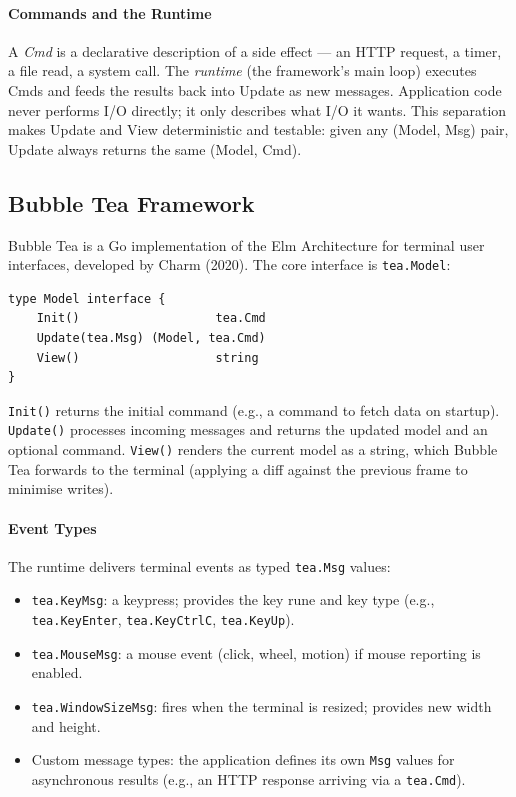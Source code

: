 \paragraph{Commands and the Runtime}

A \emph{Cmd} is a declarative description of a side effect — an HTTP request, a timer, a file read, a system call. The \emph{runtime} (the framework's main loop) executes Cmds and feeds the results back into Update as new messages. Application code never performs I/O directly; it only describes what I/O it wants. This separation makes Update and View deterministic and testable: given any (Model, Msg) pair, Update always returns the same (Model, Cmd).

\subsection{Bubble Tea Framework}

Bubble Tea is a Go implementation of the Elm Architecture for terminal user interfaces, developed by Charm (2020). The core interface is \texttt{tea.Model}:

\begin{verbatim}
type Model interface {
    Init()                   tea.Cmd
    Update(tea.Msg) (Model, tea.Cmd)
    View()                   string
}
\end{verbatim}

\texttt{Init()} returns the initial command (e.g., a command to fetch data on startup). \texttt{Update()} processes incoming messages and returns the updated model and an optional command. \texttt{View()} renders the current model as a string, which Bubble Tea forwards to the terminal (applying a diff against the previous frame to minimise writes).

\paragraph{Event Types}

The runtime delivers terminal events as typed \texttt{tea.Msg} values:
\begin{itemize}
    \item \texttt{tea.KeyMsg}: a keypress; provides the key rune and key type (e.g., \texttt{tea.KeyEnter}, \texttt{tea.KeyCtrlC}, \texttt{tea.KeyUp}).
    \item \texttt{tea.MouseMsg}: a mouse event (click, wheel, motion) if mouse reporting is enabled.
    \item \texttt{tea.WindowSizeMsg}: fires when the terminal is resized; provides new width and height.
    \item Custom message types: the application defines its own \texttt{Msg} values for asynchronous results (e.g., an HTTP response arriving via a \texttt{tea.Cmd}).
\end{itemize}


